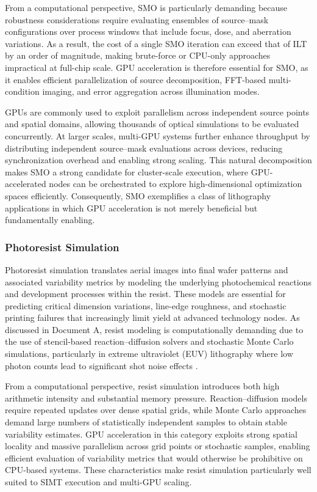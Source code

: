 \documentclass[pdflatex,sn-mathphys-num]{sn-jnl}%
\theoremstyle{thmstyleone}%
\theoremstyle{thmstyletwo}%
\theoremstyle{thmstylethree}%
\begin{document}
From a computational perspective, SMO is particularly demanding because robustness considerations require evaluating ensembles of source–mask configurations over process windows that include focus, dose, and aberration variations. As a result, the cost of a single SMO iteration can exceed that of ILT by an order of magnitude, making brute-force or CPU-only approaches impractical at full-chip scale. GPU acceleration is therefore essential for SMO, as it enables efficient parallelization of source decomposition, FFT-based multi-condition imaging, and error aggregation across illumination modes.

GPUs are commonly used to exploit parallelism across independent source points and spatial domains, allowing thousands of optical simulations to be evaluated concurrently. At larger scales, multi-GPU systems further enhance throughput by distributing independent source–mask evaluations across devices, reducing synchronization overhead and enabling strong scaling. This natural decomposition makes SMO a strong candidate for cluster-scale execution, where GPU-accelerated nodes can be orchestrated to explore high-dimensional optimization spaces efficiently. Consequently, SMO exemplifies a class of lithography applications in which GPU acceleration is not merely beneficial but fundamentally enabling.

\subsubsection{Photoresist Simulation}
Photoresist simulation translates aerial images into final wafer patterns and associated variability metrics by modeling the underlying photochemical reactions and development processes within the resist. These models are essential for predicting critical dimension variations, line-edge roughness, and stochastic printing failures that increasingly limit yield at advanced technology nodes. As discussed in Document A, resist modeling is computationally demanding due to the use of stencil-based reaction–diffusion solvers and stochastic Monte Carlo simulations, particularly in extreme ultraviolet (EUV) lithography where low photon counts lead to significant shot noise effects \cite{Gallatin2005,Mack2007FundamentalPO}.

From a computational perspective, resist simulation introduces both high arithmetic intensity and substantial memory pressure. Reaction–diffusion models require repeated updates over dense spatial grids, while Monte Carlo approaches demand large numbers of statistically independent samples to obtain stable variability estimates. GPU acceleration in this category exploits strong spatial locality and massive parallelism across grid points or stochastic samples, enabling efficient evaluation of variability metrics that would otherwise be prohibitive on CPU-based systems. These characteristics make resist simulation particularly well suited to SIMT execution and multi-GPU scaling.
\end{document}
